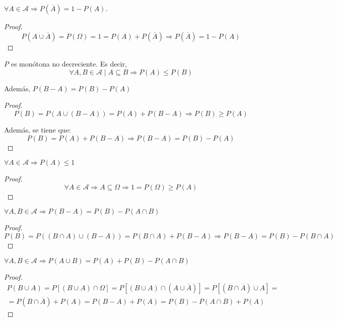 \begin{prop} \label{prop:prob_complementario}
    $\forall A \in \mathcal{A} \Rightarrow P(\overline{A}) = 1-P(A)$.
\end{prop}
\begin{proof}
  $$P(A \cup \overline{A}) = P(\Omega) = 1 = P(A) + P(\overline{A}) \Rightarrow P(\overline{A}) = 1 - P(A)$$
\end{proof}

\begin{prop} \label{prop:prob_monotona}
    $P$ es monótona no decreciente. Es decir,
    $$\forall A,B \in \mathcal{A} \mid A \subseteq B \Rightarrow P(A) \leq P(B)$$
    
    Además, $P(B-A)=P(B)-P(A)$
\end{prop}
\begin{proof}
  $$P(B) = P(A \cup (B-A)) = P(A) + P(B-A) \Rightarrow P(B) \geq P(A)$$

    Además, se tiene que:
  $$P(B) = P(A) + P(B-A) \Rightarrow P(B-A) = P(B) - P(A)$$
\end{proof}

\begin{prop}
    $\forall A \in \mathcal{A} \Rightarrow P(A) \leq 1$
\end{prop}
\begin{proof}
  $$\forall A \in \mathcal{A} \Rightarrow A \subseteq \Omega \Rightarrow 1 = P(\Omega) \geq P(A)$$
\end{proof}

\begin{prop}
    $\forall A,B \in \mathcal{A} \Rightarrow P(B-A) = P(B) - P(A \cap B)$
\end{prop}
\begin{proof}
  $$P(B) = P((B \cap A) \cup (B-A)) = P(B \cap A) + P(B-A) \Rightarrow P(B-A) = P(B) - P(B \cap A)$$
\end{proof}

\begin{prop} \label{prop:prob_union}
    $\forall A,B \in \mathcal{A} \Rightarrow P(A\cup B) = P(A) + P(B) -P(A \cap B)$
\end{prop}
\begin{proof}
    \begin{multline*}
        P(B \cup A)
        = P[(B \cup A) \cap \Omega]
        = P[(B \cup A) \cap (A \cup \overline{A})]
        = P[(B \cap \overline{A}) \cup A]
        =\\
        = P(B \cap \overline{A}) + P(A)
        = P(B-A) + P(A)
        = P(B) - P(A\cap B) + P(A)
    \end{multline*}
\end{proof}

